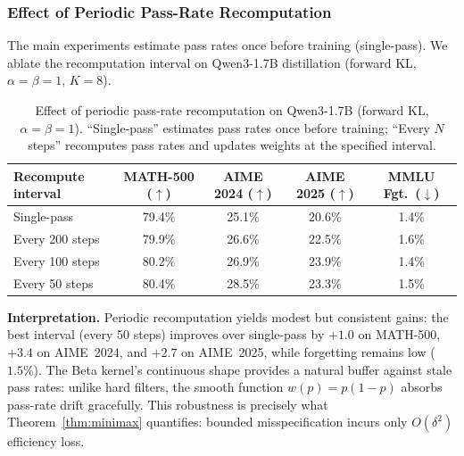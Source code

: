 \documentclass{article}
\newcommand{\mstd}[2]{#1\if\relax\detokenize{#2}\relax\else{$\scriptstyle\,\pm\,#2$}\fi\%}
\begin{document}
\subsubsection{Effect of Periodic Pass-Rate Recomputation}
\label{app:ablation_recompute}

The main experiments estimate pass rates once before training (single-pass). We ablate the recomputation interval on Qwen3-1.7B distillation (forward KL, $\alpha{=}\beta{=}1$, $K{=}8$).

\begin{table}[h]
\caption{Effect of periodic pass-rate recomputation on Qwen3-1.7B (forward KL, $\alpha{=}\beta{=}1$). ``Single-pass'' estimates pass rates once before training; ``Every $N$ steps'' recomputes pass rates and updates weights at the specified interval.}
\centering
\begin{tabular}{l|cccc}
\toprule
\textbf{Recompute interval} & MATH-500 ($\uparrow$) & AIME 2024 ($\uparrow$) & AIME 2025 ($\uparrow$) & MMLU Fgt.\ ($\downarrow$) \\
\midrule
Single-pass & \mstd{79.4}{} & \mstd{25.1}{} & \mstd{20.6}{} & 1.4\% \\
Every 200 steps & \mstd{79.9}{} & \mstd{26.6}{} & \mstd{22.5}{} & 1.6\% \\
Every 100 steps & \mstd{80.2}{} & \mstd{26.9}{} & \mstd{23.9}{} & 1.4\% \\
Every 50 steps  & \mstd{80.4}{} & \mstd{28.5}{} & \mstd{23.3}{} & 1.5\% \\
\bottomrule
\end{tabular}
\label{tab:ablation_recompute}
\end{table}

\textbf{Interpretation.} Periodic recomputation yields modest but consistent gains: the best interval (every 50 steps) improves over single-pass by $+1.0$ on MATH-500, $+3.4$ on AIME~2024, and $+2.7$ on AIME~2025, while forgetting remains low ($1.5\%$). The Beta kernel's continuous shape provides a natural buffer against stale pass rates: unlike hard filters, the smooth function $w(p) = p(1-p)$ absorbs pass-rate drift gracefully. This robustness is precisely what Theorem~\ref{thm:minimax} quantifies: bounded misspecification incurs only $O(\delta^2)$ efficiency loss.
\end{document}
